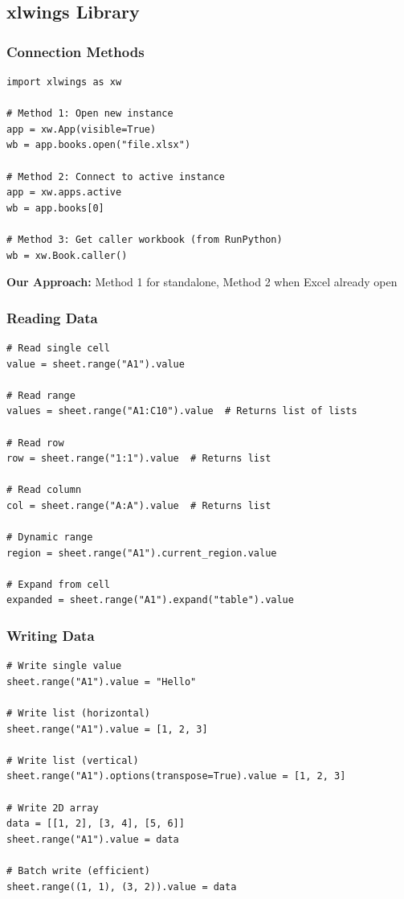 \subsection{xlwings Library}

\subsubsection{Connection Methods}

\begin{lstlisting}[style=pythonstyle]
import xlwings as xw

# Method 1: Open new instance
app = xw.App(visible=True)
wb = app.books.open("file.xlsx")

# Method 2: Connect to active instance
app = xw.apps.active
wb = app.books[0]

# Method 3: Get caller workbook (from RunPython)
wb = xw.Book.caller()
\end{lstlisting}

\textbf{Our Approach:} Method 1 for standalone, Method 2 when Excel already open

\subsubsection{Reading Data}

\begin{lstlisting}[style=pythonstyle]
# Read single cell
value = sheet.range("A1").value

# Read range
values = sheet.range("A1:C10").value  # Returns list of lists

# Read row
row = sheet.range("1:1").value  # Returns list

# Read column  
col = sheet.range("A:A").value  # Returns list

# Dynamic range
region = sheet.range("A1").current_region.value

# Expand from cell
expanded = sheet.range("A1").expand("table").value
\end{lstlisting}

\subsubsection{Writing Data}

\begin{lstlisting}[style=pythonstyle]
# Write single value
sheet.range("A1").value = "Hello"

# Write list (horizontal)
sheet.range("A1").value = [1, 2, 3]

# Write list (vertical)
sheet.range("A1").options(transpose=True).value = [1, 2, 3]

# Write 2D array
data = [[1, 2], [3, 4], [5, 6]]
sheet.range("A1").value = data

# Batch write (efficient)
sheet.range((1, 1), (3, 2)).value = data
\end{lstlisting}

